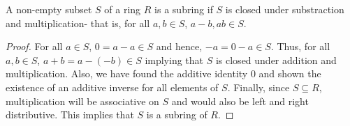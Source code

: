 \begin{proposition}
	A non-empty subset $S$ of a ring $R$ is a subring if $S$ is closed under substraction and multiplication- that is, for all $a,b\in S$, $a-b,ab\in S$.
\end{proposition}
\begin{proof}
	For all $a\in S$, $0=a-a\in S$ and hence, $-a = 0-a \in S$. Thus, for all $a,b\in S$, $a+b = a-(-b) \in S$ implying that $S$ is closed under addition and multiplication. Also, we have found the additive identity $0$ and shown the existence of an additive inverse for all elements of $S$. Finally, since $S\subseteq R$, multiplication will be associative on $S$ and would also be left and right distributive. This implies that $S$ is a subring of $R$.
\end{proof}

